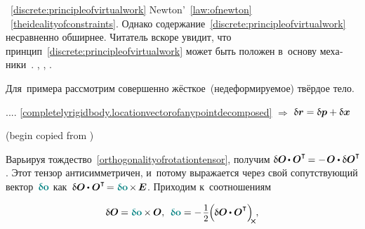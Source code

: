 \begin{otherlanguage}{russian}
~\eqref{discrete:principleofvirtualwork}
Newton’~\eqref{law:ofnewton}
~\eqref{theidealityofconstraints}.
Однако
содержание~\eqref{discrete:principleofvirtualwork}
несравненно обширнее.
Читатель вскоре увидит, что
принцип~\eqref{discrete:principleofvirtualwork}
может быть положен
в~основу механики~\cite{gantmacher-analyticalmechanics}.
,
,
.

Для~примера рассмотрим совершенно жёсткое~(недеформируемое) твёрдое тело.

.... \eqref{completelyrigidbody.locationvectorofanypointdecomposed} ${\Rightarrow}$
${\updelta\hspace{-0.1ex}\bm{r} = \updelta\hspace{-0.1ex}\bm{p} + \updelta\hspace{-0.1ex}\bm{x}}$

(begin copied from )

Варьируя тождество~\eqref{orthogonalityofrotationtensor}, получим ${\variation{\rotationtensor} \hspace{-0.2ex} \dotp \rotationtensor^{\T} \hspace{-0.2ex} = - \hspace{.2ex} \rotationtensor \dotp \variation{\rotationtensor}^{\T}\!}$.
Этот тензор антисимметричен, и~потому выражается через свой сопутствующий вектор~${\varvector{o}}$ как~${\variation{\rotationtensor} \hspace{-0.1ex} \dotp \rotationtensor^{\T} \hspace{-0.3ex} = \varvector{o} \hspace{-0.2ex} \times \hspace{-0.2ex} \UnitDyad}$.
Приходим к~соотношениям

\nopagebreak\vspace{-0.5em}\begin{equation}
\variation{\rotationtensor} \hspace{-0.1ex} = \varvector{o} \hspace{-0.1ex} \times \hspace{-0.1ex} \rotationtensor , \:\:
\varvector{o} = - \hspace{.2ex} \scalebox{.93}{$ \displaystyle\onehalf $} \hspace{-0.1ex} \Bigl( \hspace{-0.1ex} \variation{\rotationtensor} \hspace{-0.1ex} \dotp \rotationtensor^{\T} \Bigr)_{\hspace{-0.25em}\Xcompanion}
\hspace{-0.1ex} ,
\end{equation}


\end{otherlanguage}
